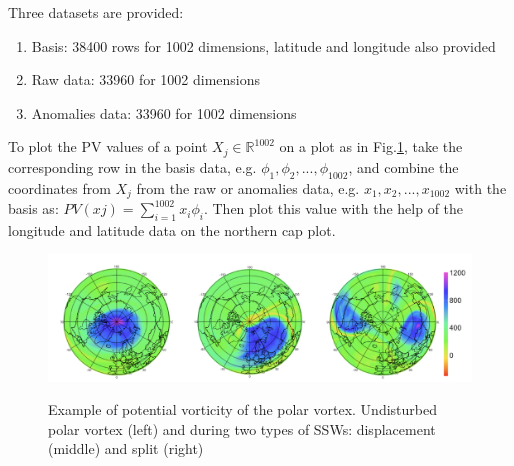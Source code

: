 \documentclass[10pt]{article}
\begin{document}
Three datasets are provided: 
\begin{enumerate}
    \item Basis: 38400 rows for 1002 dimensions, latitude and longitude also provided \\
    \item Raw data: 33960 for 1002 dimensions\\
    \item Anomalies data: 33960 for 1002 dimensions
\end{enumerate}

To plot the PV values of a point $X_j \in \mathbb{R} ^{1002}$ on a plot as in Fig.\ref{fig:example_vortex}, take the corresponding row in the basis data, e.g. $\phi_1, \phi_2,...,\phi_{1002}$, and combine the coordinates from $X_j$ from the raw or anomalies data, e.g. $x_1, x_2,...,x_{1002}$ with the basis as: $PV(xj)=\sum_{i=1}^{1002}x_i \phi_i$. Then plot this value with the help of the longitude and latitude data on the northern cap plot. 

\begin{figure}[!h]
        \centering
       \includegraphics[width=\textwidth]{images/im1.png}
       \label{fig:example_vortex}
       \caption[]{\small Example of potential vorticity of the polar vortex. Undisturbed polar vortex (left) and during two types of SSWs: displacement (middle)
and split (right)~\cite{SlidesRaphael}}
\end{figure}


\newpage
\begin{onecolumn}


\end{onecolumn}
	
\end{document}

